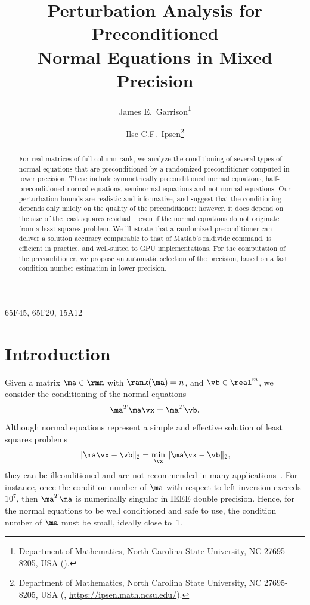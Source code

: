 \documentclass[final]{siamart220329}%
\title{Perturbation Analysis for Preconditioned\\ Normal Equations in Mixed Precision}
\author{James E.\ Garrison\thanks{Department of Mathematics, North Carolina State University,
NC 27695-8205, USA
  (\email{jegarri3@ncsu.edu}).}
\and Ilse C.F.\ Ipsen\thanks{Department of Mathematics, North Carolina State University,
NC 27695-8205, USA
  (\email{ipsen@ncsu.edu}, \url{https://ipsen.math.ncsu.edu/}).}}
\begin{document}
\maketitle


\begin{abstract}
For real matrices of full column-rank, 
we analyze the conditioning of several types of normal equations that are preconditioned by a randomized preconditioner computed in lower precision. These include 
symmetrically preconditioned normal equations,
half-preconditioned normal equations, seminormal equations and not-normal equations.
 Our perturbation bounds are realistic and informative, and suggest that the conditioning depends only mildly on the quality of the preconditioner; however, it
does depend on the size of the least squares residual
-- even if the normal equations do not originate from a least squares problem.
We illustrate that a randomized preconditioner can deliver
a solution accuracy comparable to that of  Matlab’s mldivide command, is efficient in practice, and 
well-suited to GPU implementations. For the computation 
of the preconditioner,
we propose an automatic selection of the precision, based on a fast condition
number estimation in lower precision.
\end{abstract}


\begin{MSCcodes}
65F45, 65F20, 15A12
\end{MSCcodes}


\section{Introduction}

Given a matrix $\ma\in\rmn$ with $\rank(\ma)=n$, and $\vb\in\real^m$, we consider
the conditioning of the normal equations 
\begin{equation}\label{e_ne1}
\ma^T\ma\vx=\ma^T\vb.
\end{equation}
Although normal equations represent a simple and effective solution of
least squares problems
\begin{equation}\label{e_ls}
\|\ma\vx-\vb\|_2=
\min_{\vx}{\|\ma\vx-\vb\|_2},
\end{equation}
they can be illconditioned and are not recommended in many applications~\cite[Section 5.3.7]{GovL13}. 
For instance, once the condition number of $\ma$ with respect to left inversion exceeds $10^7$,
then $\ma^T\ma$ is numerically singular in IEEE double precision.
Hence, for the normal equations to be well conditioned and safe to use, the condition number of $\ma$ must be small,
ideally close to~1. 
  
\end{document}
